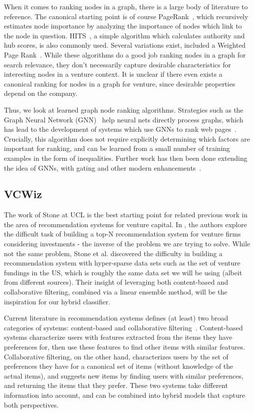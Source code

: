 When it comes to ranking nodes in a graph, there is a large body of literature to reference. The canonical starting point is of course PageRank~\cite{page1999pagerank}, which recursively estimates node importance by analyzing the importance of nodes which link to the node in question. HITS~\cite{kleinberg1999authoritative}, a simple algorithm which calculates authority and hub scores, is also commonly used. Several variations exist, included a Weighted Page Rank~\cite{xing2004weighted}. While these algorithms do a good job ranking nodes in a graph for search relevance, they don't necessarily capture desirable characteristics for interesting nodes in a venture context. It is unclear if there even exists a canonical ranking for nodes in a graph for venture, since desirable properties depend on the company.

Thus, we look at learned graph node ranking algorithms. Strategies such as the Graph Neural Network (GNN)~\cite{scarselli2009graph} help neural nets directly process graphs, which has lead to the development of systems which use GNNs to rank web pages~\cite{scarselli2005graph}. Crucially, this algorithm does not require explicitly determining which factors are important for ranking, and can be learned from a small number of training examples in the form of inequalities. Further work has then been done extending the idea of GNNs, with gating and other modern enhancements~\cite{DBLP:journals/corr/LiTBZ15}.

\subsection*{VCWiz}

The work of Stone at UCL is the best starting point for related previous work in the area of recommendation systems for venture capital. In \cite{Stone:2013:EST:2541167.2507882}, the authors explore the difficult task of building a top-N recommendation system for venture firms considering investments - the inverse of the problem we are trying to solve. While not the same problem, Stone et al. discovered the difficulty in building a recommendation system with hyper-sparse data sets such as the set of venture fundings in the US, which is roughly the same data set we will be using (albeit from different sources). Their insight of leveraging both content-based and collaborative filtering, combined via a linear ensemble method, will be the inspiration for our hybrid classifier.

Current literature in recommendation systems defines (at least) two broad categories of systems: content-based and collaborative filtering~\cite{Burke2002}. Content-based systems characterize users with features extracted from the items they have preferences for, then use these features to find other items with similar features. Collaborative filtering, on the other hand, characterizes users by the set of preferences they have for a canonical set of items (without knowledge of the actual items), and suggests new items by finding users with similar preferences, and returning the items that they prefer. These two systems take different information into account, and can be combined into hybrid models that capture both perspectives.

